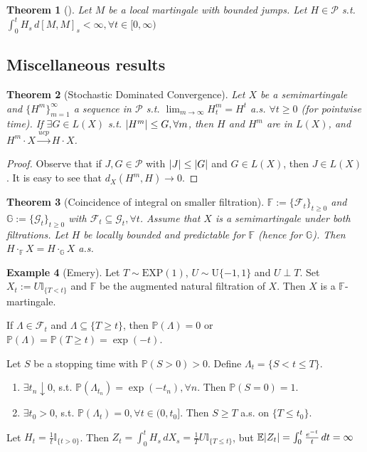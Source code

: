 \documentclass[openany,oneside]{book}
\newtheorem{thm}{Theorem}[section]
\theoremstyle{definition}
\newtheorem{eg}[thm]{Example}
\theoremstyle{remark}
\newcommand{\E}{\mathbb{E}} %
\renewcommand{\P}{\mathbb{P}} %
\newcommand{\I}{\mathbb{I}} %
\DeclarePairedDelimiter{\abs}{\lvert}{\rvert} %
\newcommand{\pred}{\mathcal{P}} %
\begin{document}
\begin{thm}[]
Let $M$ be a local martingale with bounded jumps. Let $H\in\pred$ s.t. $\int_0^t H_s \,d [M,M]_s < \infty, \forall t\in[0,\infty)$
\end{thm}

\subsection{Miscellaneous results}
\begin{thm}[Stochastic Dominated Convergence]
Let $X$ be a semimartingale and $\{H^m\}_{m=1}^\infty$ a sequence in $\pred$ s.t. $\lim_{m\to\infty} H^m_t = H^t$ a.s. $\forall t\ge 0$ (for pointwise time). If $\exists G\in L(X)$ s.t. $\abs{H^m} \le G, \forall m$, then $H$ and $H^m$ are in $L(X)$, and $H^m \cdot X \xrightarrow{ucp} H\cdot X$.
\end{thm}
\begin{proof}
Observe that if $J,G\in\pred$ with $\abs{J}\le\abs{G}$ and $G\in L(X)$, then $J\in L(X)$. It is easy to see that $d_X(H^m,H) \to 0$.
\end{proof}

\begin{thm}[Coincidence of integral on smaller filtration]
$\mathbb{F}:=\{\mathcal{F}_t\}_{t\ge 0}$ and $\mathbb{G}:=\{\mathcal{G}_t\}_{t\ge 0}$ with $\mathcal{F}_t \subseteq \mathcal{G}_t, \forall t$. Assume that $X$ is a semimartingale under both filtrations. Let $H$ be locally bounded and predictable for $\mathbb{F}$ (hence for $\mathbb{G}$). Then $H\cdot_{\mathbb{F}} X = H\cdot_{\mathbb{G}} X$ a.s.
\end{thm}

\begin{eg}[Emery]
Let $T\sim \mathrm{EXP}(1)$, $U\sim \mathrm{U}\{-1,1\}$ and $U\perp T$. Set $X_t :=U\I_{\{T< t\}}$ and $\mathbb{F}$ be the augmented natural filtration of $X$. Then $X$ is a $\mathbb{F}$-martingale.
\par
If $\Lambda \in \mathcal{F}_t$ and $\Lambda \subseteq \{T\ge t\}$, then $\P(\Lambda) =0$ or $\P(\Lambda)=\P(T\ge t) = \exp(-t)$.
\par
Let $S$ be a stopping time with $\P(S>0)>0$. Define $\Lambda_t = \{S<t\le T\}$.
\begin{enumerate}
\item $\exists t_n \downarrow 0$, s.t. $\P(\Lambda_{t_n}) = \exp(-t_n), \forall n$. Then $\P(S=0)=1$.
\item $\exists t_0 >0$, s.t. $\P(\Lambda_{t}) = 0, \forall t\in(0,t_0]$. Then $S\ge T$ a.s. on $\{T\le t_0\}$.
\end{enumerate}
\par
Let $H_t = \frac{1}{t}\I_{\{t>0\}}$. Then $Z_t = \int_0^t H_s \,d X_s = \frac{1}{T}U\I_{\{T\le t\}}$, but $\E\abs{Z_t} = \int_0^t \frac{e^{-t}}{t}\,d t = \infty$

\end{eg}
\end{document}
